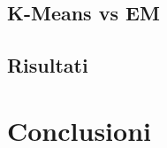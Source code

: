 \documentclass{llncs}
\begin{document}
	\subsection{K-Means vs EM}
	\subsection{Risultati}

	\section{Conclusioni}

    
\end{document}
